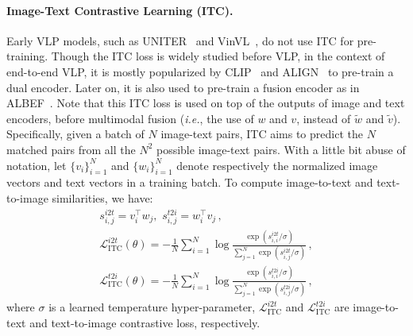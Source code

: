 \paragraph{Image-Text Contrastive Learning (ITC).} Early VLP models, such as UNITER~\citep{chen2020uniter} and VinVL~\citep{zhang2021vinvl}, do not use ITC for pre-training. Though the ITC loss is widely studied before VLP, in the context of end-to-end VLP, it is mostly popularized by CLIP~\citep{radford2021learning} and ALIGN~\citep{jia2021scaling} to pre-train a dual encoder. Later on, it is also used to pre-train a fusion encoder as in ALBEF~\citep{li2021align}. Note that this ITC loss is used on top of the outputs of image and text encoders, before multimodal fusion (\emph{i.e.}, the use of $w$ and $v$, instead of $\tilde{w}$ and $\tilde{v}$). Specifically, given a batch of $N$ image-text pairs, ITC aims to predict the $N$ matched pairs from all the $N^2$ possible image-text pairs. With a little bit abuse of notation, let $\{v_i\}_{i=1}^N$ and $\{w_i\}_{i=1}^N$ denote respectively the normalized image vectors and text vectors in a training batch. To compute image-to-text and text-to-image similarities, we have: 
\begin{align}
    s_{i,j}^{i2t} = v_i^\top w_j, \,\, s_{i,j}^{t2i} = w_i^\top v_j \,,\\
    \mathcal{L}_{\text{ITC}}^{i2t}(\theta) = -\frac{1}{N} \sum_{i=1}^N\log\frac{\exp(s_{i,i}^{i2t}/\sigma)}{\sum_{j=1}^N \exp (s_{i,j}^{i2t}/\sigma)} \,,\\ \mathcal{L}_{\text{ITC}}^{t2i}(\theta) = -\frac{1}{N} \sum_{i=1}^N\log\frac{\exp(s_{i,i}^{t2i}/\sigma)}{\sum_{j=1}^N \exp (s_{i,j}^{t2i}/\sigma)}\,,
\end{align}
where $\sigma$ is a learned temperature hyper-parameter,  $\mathcal{L}_{\text{ITC}}^{i2t}$ and $\mathcal{L}_{\text{ITC}}^{t2i}$ are image-to-text and text-to-image contrastive loss, respectively.

